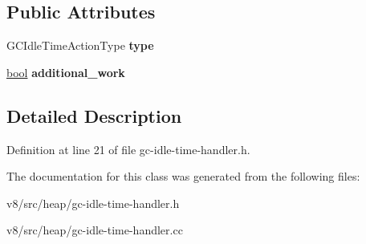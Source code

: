 \subsection*{Public Attributes}
\begin{DoxyCompactItemize}
\item 
\mbox{\label{classv8_1_1internal_1_1GCIdleTimeAction_a212425aefe31dba1f8e914a21bc2f94f}} 
G\+C\+Idle\+Time\+Action\+Type {\bfseries type}
\item 
\mbox{\label{classv8_1_1internal_1_1GCIdleTimeAction_aad4d2facf246f97d143f85fe0d371571}} 
\mbox{\hyperlink{classbool}{bool}} {\bfseries additional\+\_\+work}
\end{DoxyCompactItemize}


\subsection{Detailed Description}


Definition at line 21 of file gc-\/idle-\/time-\/handler.\+h.



The documentation for this class was generated from the following files\+:\begin{DoxyCompactItemize}
\item 
v8/src/heap/gc-\/idle-\/time-\/handler.\+h\item 
v8/src/heap/gc-\/idle-\/time-\/handler.\+cc\end{DoxyCompactItemize}
